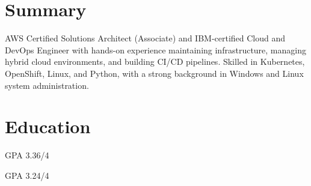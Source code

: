 \documentclass[a4paper,10pt]{article}
\begin{document}

\section*{Summary}
AWS Certified Solutions Architect (Associate) and IBM-certified Cloud and DevOps Engineer with hands-on experience maintaining infrastructure, managing hybrid cloud environments, and building CI/CD pipelines. Skilled in Kubernetes, OpenShift, Linux, and Python, with a strong background in Windows and Linux system administration.

\section*{Education}
GPA 3.36/4\par
{}
GPA 3.24/4\par
\end{document}
